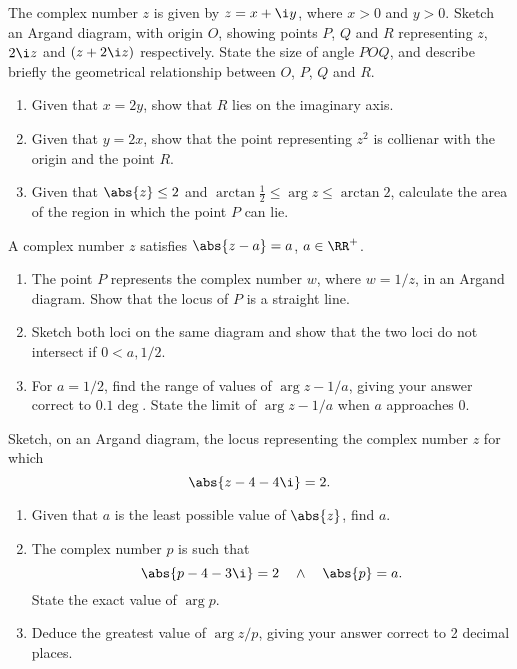\begin{problem}
    The complex number $z$ is given by $z = x + \i y$, where $x > 0$ and $y > 0$. Sketch an Argand diagram, with origin $O$, showing points $P$, $Q$ and $R$ representing $z$, $2\i z$ and $(z + 2\i z)$ respectively. State the size of angle $POQ$, and describe briefly the geometrical relationship between $O$, $P$, $Q$ and $R$.

    \begin{enumerate}
        \item Given that $x = 2y$, show that $R$ lies on the imaginary axis.
        \item Given that $y = 2x$, show that the point representing $z^2$ is collienar with the origin and the point $R$.
        \item Given that $\abs{z} \leq 2$ and $\arctan \frac12 \leq \arg z \leq \arctan 2$, calculate the area of the region in which the point $P$ can lie.
    \end{enumerate}
\end{problem}

\begin{problem}
    A complex number $z$ satisfies $\abs{z - a} = a$, $a \in \RR^+$.

    \begin{enumerate}
        \item The point $P$ represents the complex number $w$, where $w = 1/z$, in an Argand diagram. Show that the locus of $P$ is a straight line.
        \item Sketch both loci on the same diagram and show that the two loci do not intersect if $0 < a , 1/2$.
        \item For $a = 1/2$, find the range of values of $\arg{z - 1/a}$, giving your answer correct to $0.1\deg$. State the limit of $\arg{z - 1/a}$ when $a$ approaches 0.
    \end{enumerate}
\end{problem}

\begin{problem}
    Sketch, on an Argand diagram, the locus representing the complex number $z$ for which \[\abs{z - 4 - 4\i} = 2.\]

    \begin{enumerate}
        \item Given that $a$ is the least possible value of $\abs{z}$, find $a$.
        \item The complex number $p$ is such that \[\abs{p - 4 - 3\i} = 2 \quad \land \quad \abs{p} = a.\] State the exact value of $\arg p$.
        \item Deduce the greatest value of $\arg{z/p}$, giving your answer correct to 2 decimal places.
    \end{enumerate}
\end{problem}

